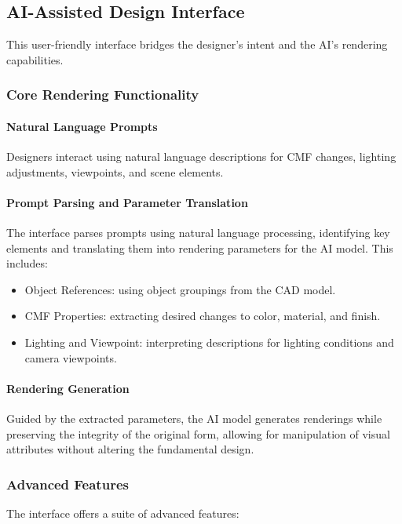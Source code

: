 \documentclass[12pt]{article}
\begin{document}
\subsection{AI-Assisted Design Interface}
This user-friendly interface bridges the designer's intent and the AI's rendering capabilities.

\subsubsection{Core Rendering Functionality}

\paragraph{Natural Language Prompts}
Designers interact using natural language descriptions for CMF changes, lighting adjustments, viewpoints, and scene elements.

\paragraph{Prompt Parsing and Parameter Translation}
The interface parses prompts using natural language processing, identifying key elements and translating them into rendering parameters for the AI model. This includes:

\begin{itemize}
    \item Object References: using object groupings from the CAD model.
    \item CMF Properties: extracting desired changes to color, material, and finish.
    \item Lighting and Viewpoint: interpreting descriptions for lighting conditions and camera viewpoints.
\end{itemize}

\paragraph{Rendering Generation}
Guided by the extracted parameters, the AI model generates renderings while preserving the integrity of the original form, allowing for manipulation of visual attributes without altering the fundamental design.

\subsubsection{Advanced Features}
The interface offers a suite of advanced features:
\end{document}
